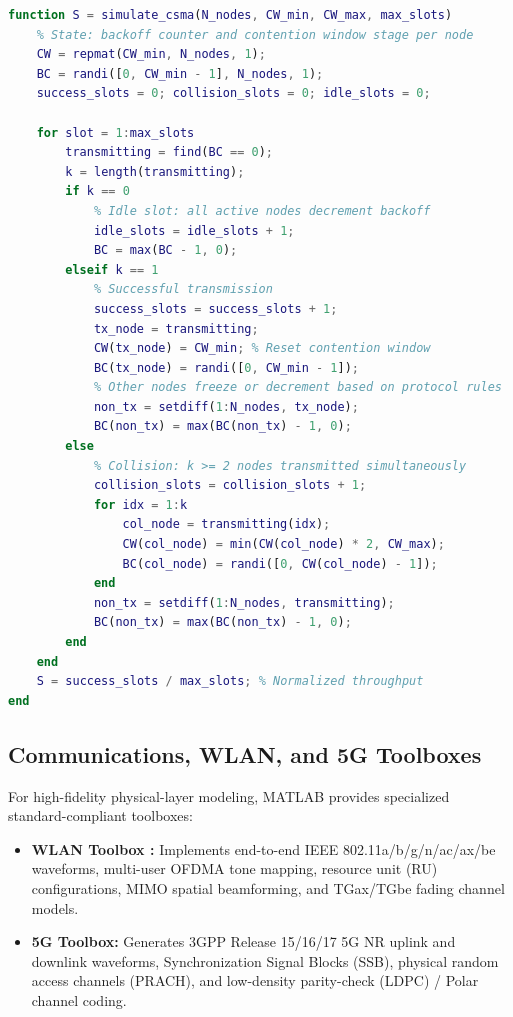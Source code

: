 \begin{lstlisting}[language=Matlab, caption={Vectorized Monte Carlo simulation of slotted CSMA/CA in MATLAB.}, label={lst:matlab_csma}]
function S = simulate_csma(N_nodes, CW_min, CW_max, max_slots)
    % State: backoff counter and contention window stage per node
    CW = repmat(CW_min, N_nodes, 1);
    BC = randi([0, CW_min - 1], N_nodes, 1);
    success_slots = 0; collision_slots = 0; idle_slots = 0;
    
    for slot = 1:max_slots
        transmitting = find(BC == 0);
        k = length(transmitting);
        if k == 0
            % Idle slot: all active nodes decrement backoff
            idle_slots = idle_slots + 1;
            BC = max(BC - 1, 0);
        elseif k == 1
            % Successful transmission
            success_slots = success_slots + 1;
            tx_node = transmitting;
            CW(tx_node) = CW_min; % Reset contention window
            BC(tx_node) = randi([0, CW_min - 1]);
            % Other nodes freeze or decrement based on protocol rules
            non_tx = setdiff(1:N_nodes, tx_node);
            BC(non_tx) = max(BC(non_tx) - 1, 0);
        else
            % Collision: k >= 2 nodes transmitted simultaneously
            collision_slots = collision_slots + 1;
            for idx = 1:k
                col_node = transmitting(idx);
                CW(col_node) = min(CW(col_node) * 2, CW_max);
                BC(col_node) = randi([0, CW(col_node) - 1]);
            end
            non_tx = setdiff(1:N_nodes, transmitting);
            BC(non_tx) = max(BC(non_tx) - 1, 0);
        end
    end
    S = success_slots / max_slots; % Normalized throughput
end
\end{lstlisting}

\subsection{Communications, WLAN, and 5G Toolboxes}
For high-fidelity physical-layer modeling, MATLAB provides specialized standard-compliant toolboxes:
\begin{itemize}
    \item \textbf{WLAN Toolbox \cite{matlab_wlan}:} Implements end-to-end IEEE 802.11a/b/g/n/ac/ax/be waveforms, multi-user OFDMA tone mapping, resource unit (RU) configurations, MIMO spatial beamforming, and TGax/TGbe fading channel models.
    \item \textbf{5G Toolbox:} Generates 3GPP Release 15/16/17 5G NR uplink and downlink waveforms, Synchronization Signal Blocks (SSB), physical random access channels (PRACH), and low-density parity-check (LDPC) / Polar channel coding.
\end{itemize}

